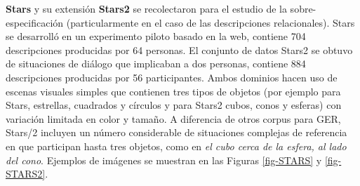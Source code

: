 \label{sec:corpusSTARS}
{\bf Stars} \cite{stars-mutual-disamb} y su extensi\'on {\bf Stars2} se recolectaron para el estudio de la sobre-especificaci\'on (particularmente en el caso de las descripciones relacionales). Stars se desarroll\'o en un experimento piloto basado en la web, contiene 704 descripciones producidas por 64 personas. El conjunto de datos Stars2 se obtuvo de situaciones de di\'alogo que implicaban a dos personas, contiene 884 descripciones producidas por 56 participantes. Ambos dominios hacen uso de escenas visuales simples que contienen tres tipos de objetos (por ejemplo para Stars, estrellas, cuadrados y c\'irculos y para Stars2 cubos, conos y esferas) con variaci\'on limitada en color y tama\~no. A diferencia de otros corpus para GER, Stars/2 incluyen un n\'umero considerable de situaciones complejas de referencia en que participan hasta tres objetos, como en {\it el cubo cerca de la esfera, al lado del cono}. Ejemplos de im\'agenes se muestran en las Figuras \ref{fig-STARS} y \ref{fig-STARS2}.

